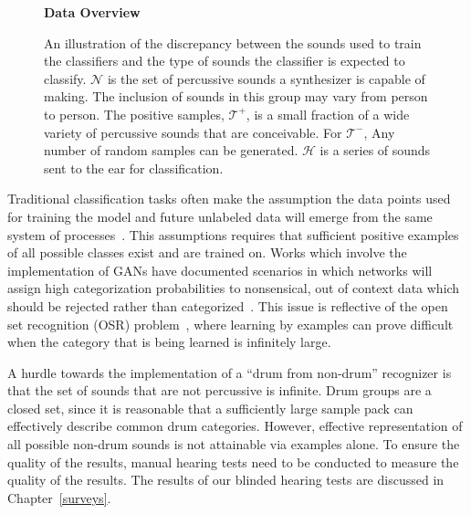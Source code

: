 \documentclass[\main/thesis.tex]{subfiles}
\begin{document}
\begin{figure}[]
    \begin{center}
    \textbf{Data Overview}
    \end{center}
    \caption{ An illustration of the discrepancy between the sounds used to train the classifiers and the type of sounds the classifier is expected to classify. $\mathcal{N}$ is the set of percussive sounds a synthesizer is capable of making. The inclusion of sounds in this group may vary from person to person. The positive samples, $\mathcal{T^{+}}$, is a small fraction of a wide variety of percussive sounds that are conceivable. For $\mathcal{T^{-}}$, Any number of random samples can be generated. $\mathcal{H}$ is a series of sounds sent to the ear for classification.}
\label{fig:ven_data}
\end{figure}

Traditional classification tasks often make the assumption the data points used for training the model and future unlabeled data will emerge from the same system of processes~\cite{geng2020recent,mundt2019open}. This assumptions requires that sufficient positive examples of all possible classes exist and are trained on. Works which involve the implementation of GANs have documented scenarios in which networks will assign high categorization probabilities to nonsensical, out of context data which should be rejected rather than categorized~\cite{geng2020recent,mundt2019open,hassen2020learning}. This issue is reflective of the open set recognition (OSR) problem~\cite{geng2020recent,mundt2019open}, where learning by examples can prove difficult when the category that is being learned is infinitely large. 

A hurdle towards the implementation of a \enquote{drum from non-drum} recognizer is that the set of sounds that are not percussive is infinite. Drum groups are a closed set, since it is reasonable that a sufficiently large sample pack can effectively describe common drum categories. However, effective representation of all possible non-drum sounds is not attainable via examples alone. To ensure the quality of the results, manual hearing tests need to be conducted to measure the quality of the results. The results of our blinded hearing tests are discussed in Chapter~\ref{surveys}.
\end{document}

